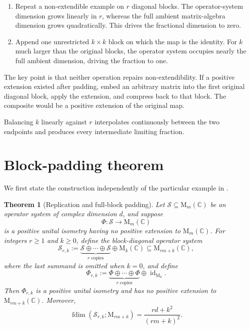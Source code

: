 \documentclass[11pt]{article}
\newtheorem{theorem}{Theorem}
\theoremstyle{remark}
\newcommand{\C}{\mathbb C}
\newcommand{\M}{\mathrm M}
\newcommand{\id}{\operatorname{id}}
\begin{document}
\begin{enumerate}
  \item Repeat a non-extendible example on $r$ diagonal blocks.  The operator-system dimension grows linearly in $r$, whereas the full ambient matrix-algebra dimension grows quadratically.  This drives the fractional dimension to zero.
  \item Append one unrestricted $k\times k$ block on which the map is the identity.  For $k$ much larger than the original blocks, the operator system occupies nearly the full ambient dimension, driving the fraction to one.
\end{enumerate}

The key point is that neither operation repairs non-extendibility.  If a positive extension existed after padding, embed an arbitrary matrix into the first original diagonal block, apply the extension, and compress back to that block.  The composite would be a positive extension of the original map.

Balancing $k$ linearly against $r$ interpolates continuously between the two endpoints and produces every intermediate limiting fraction.

\section{Block-padding theorem}

We first state the construction independently of the particular example in \cite{CDPR}.

\begin{theorem}[Replication and full-block padding]\label{thm:padding}
Let $\mathcal S\subseteq\M_m(\C)$ be an operator system of complex dimension $d$, and suppose
\[
  \Phi:\mathcal S\longrightarrow\M_m(\C)
\]
is a positive unital isometry having no positive extension to $\M_m(\C)$.  For integers $r\geq1$ and $k\geq0$, define the block-diagonal operator system
\[
 \mathcal S_{r,k}
 :=\underbrace{\mathcal S\oplus\cdots\oplus\mathcal S}_{r\text{ copies}}
   \oplus\M_k(\C)
 \subseteq \M_{rm+k}(\C),
\]
where the last summand is omitted when $k=0$, and define
\[
 \Phi_{r,k}
 :=\underbrace{\Phi\oplus\cdots\oplus\Phi}_{r\text{ copies}}
   \oplus\id_{\M_k}.
\]
Then $\Phi_{r,k}$ is a positive unital isometry and has no positive extension to $\M_{rm+k}(\C)$.  Moreover,
\[
  \operatorname{fdim}(\mathcal S_{r,k};\M_{rm+k})
  =\frac{rd+k^2}{(rm+k)^2}.
\]
\end{theorem}
\end{document}
